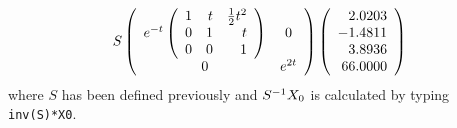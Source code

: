 \documentclass{ximera}
\begin{document}
\begin{exercise}
\begin{solution}
\begin{eqnarray*}
S\left(\begin{array}{cc} e^{-t}\left(\begin{array}{rrr}
     1  &  t   &   \frac{1}{2}t^2\\
    0   &  1   &   t\\
    0   &  0   &   1 \end{array}\right) & 0\\ 0 &e^{2t}\end{array}\right)
\left(\begin{array}{r} 2.0203\\ -1.4811 \\ 3.8936\\ 66.0000 \end{array}\right)
\end{eqnarray*}
where $S$ has been defined previously and $S^{-1} X_0$ is calculated by typing 
{\tt inv(S)*X0}.


\end{solution}
\end{exercise}
\end{document}
